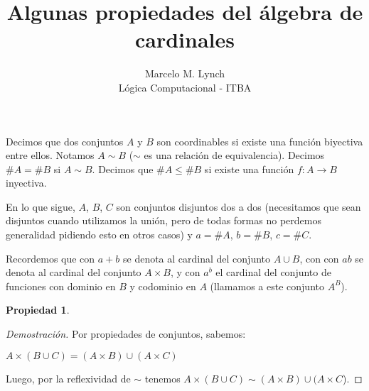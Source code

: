 \documentclass{article}
\title{Algunas propiedades del álgebra de cardinales}
\author{Marcelo M. Lynch \\ Lógica Computacional - ITBA}
\date{}
\newtheorem*{propiedad}{Propiedad}
\begin{document}
\maketitle
Decimos que dos conjuntos $A$ y $B$ son coordinables si existe una función biyectiva entre ellos. Notamos $A \sim B$ ($\sim$ es una relación de equivalencia). Decimos $\#A = \#B$ si $A \sim B$.
Decimos que $\#A \le \#B$ si existe una función $f: A \rightarrow B$ inyectiva.\newline

En lo que sigue, $A$, $B$, $C$ son conjuntos disjuntos dos a dos (necesitamos que sean disjuntos cuando utilizamos la unión, pero de todas formas no perdemos generalidad pidiendo esto en otros casos) y $a = \#A$, $b = \#B$, $c = \#C$. \newline 


Recordemos que con $a + b$ se denota al cardinal del conjunto $A \cup B$, con con $ab$ se denota al cardinal del conjunto $A \times B$, y con $a^b$ el cardinal del conjunto de funciones con dominio en $B$ y codominio en $A$ (llamamos a este conjunto $A^B$). \newline

\begin{propiedad}
\end{propiedad}
\begin{proof}[Demostración]
Por propiedades de conjuntos, sabemos: \begin{center} $A \times (B\cup C) = (A\times B) \cup (A\times C)$ \end{center}
Luego, por la reflexividad de $\sim$ tenemos $A \times (B\cup C) \sim (A\times B) \cup (A\times C$).
\end{proof}
\end{document}
